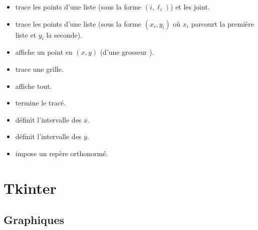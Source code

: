 \documentclass[11pt,class=report,crop=false]{standalone}
\begin{document}
\begin{itemize}
  \item {} trace les points d'une liste (sous la forme $(i,\ell_i)$) et les joint. 
  \item {} trace les points d'une liste (sous la forme $(x_i,y_i)$ où $x_i$ parcourt la première liste et $y_i$ la seconde).    
  \item {} affiche un point en $(x,y)$ (d'une grosseur ).
  \item {} trace une grille.  
  \item {} affiche tout. 
  \item {} termine le tracé.
  
  \item {} définit l'intervalle des $x$.
  \item {} définit l'intervalle des $y$.
  \item {} impose un repère orthonormé.  
\end{itemize}

\section{Tkinter}


\subsection{Graphiques}
\end{document}
